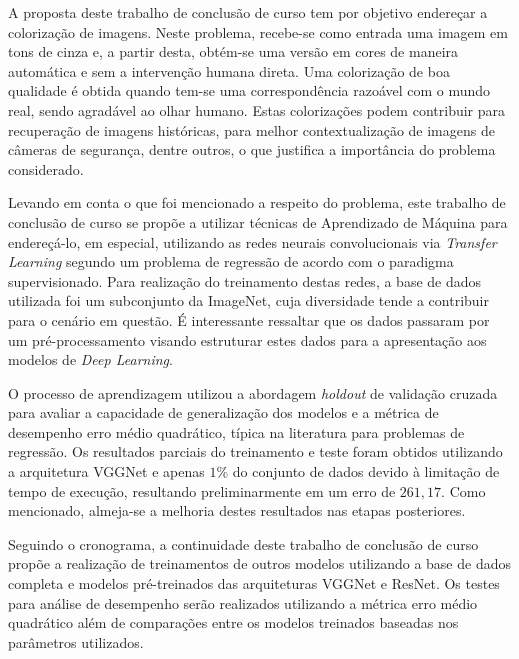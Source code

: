 A proposta deste trabalho de conclusão de curso tem por objetivo endereçar a colorização de imagens. Neste problema, recebe-se como entrada uma imagem em tons de cinza e, a partir desta, obtém-se uma versão em cores de maneira automática e sem a intervenção humana direta. Uma colorização de boa qualidade é obtida quando tem-se uma correspondência razoável com o mundo real, sendo agradável ao olhar humano. Estas colorizações podem contribuir para recuperação de  imagens históricas, para melhor contextualização de imagens de câmeras de segurança, dentre outros, o que justifica  a importância  do problema considerado.

Levando em conta o que foi mencionado a respeito do problema, este trabalho de conclusão de curso se propõe a utilizar técnicas de Aprendizado de Máquina para endereçá-lo, em especial, utilizando as redes neurais convolucionais via \emph{Transfer Learning} segundo um problema de regressão de acordo com o paradigma supervisionado. Para realização do treinamento destas redes, a base de dados utilizada foi um subconjunto da ImageNet, cuja diversidade tende a contribuir para o cenário em questão. É interessante ressaltar que os dados passaram por um pré-processamento visando estruturar estes dados para a apresentação aos modelos de \emph{Deep Learning}.

O processo de aprendizagem utilizou a abordagem \emph{holdout} de validação cruzada para avaliar a capacidade de generalização dos modelos e a métrica de desempenho erro médio quadrático, típica na literatura para problemas de regressão. Os resultados parciais do treinamento e teste foram obtidos utilizando a arquitetura VGGNet e apenas $1\%$ do conjunto de dados devido à limitação de tempo de execução, resultando preliminarmente em um erro de $261,17$. Como mencionado, almeja-se a melhoria destes resultados nas etapas posteriores.

Seguindo o cronograma, a continuidade deste trabalho de conclusão de curso propõe a realização de treinamentos de outros modelos utilizando a base de dados completa e modelos pré-treinados das arquiteturas VGGNet e ResNet. Os testes para análise de desempenho serão realizados utilizando a métrica erro médio quadrático além de comparações entre os modelos treinados baseadas nos parâmetros utilizados.
